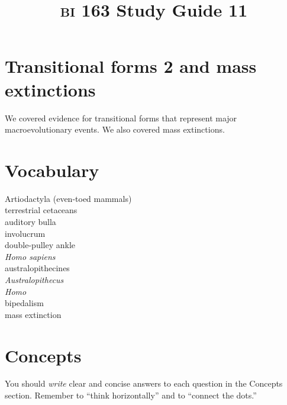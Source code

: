 \documentclass[letterpaper]{tufte-handout}
\title{{\scshape bi} 163 Study Guide 11}
\date{} %
\begin{document}
\maketitle	%

\section*{Transitional forms 2 and mass extinctions}

We covered evidence for transitional forms that represent major macroevolutionary events. We also covered mass extinctions.

\section*{Vocabulary}

\vspace{-1\baselineskip}
\begin{multicols}{2}
Artiodactyla (even-toed mammals) \\
terrestrial cetaceans \\
auditory bulla \\
involucrum \\
double-pulley ankle \\
\textit{Homo sapiens} \\
australopithecines \\
\textit{Australopithecus} \\
\textit{Homo} \\
bipedalism \\
mass extinction \\
\end{multicols}

\section*{Concepts}

You should \emph{write} clear and concise answers to each question in the Concepts section.  Remember to ``think horizontally'' and to ``connect the dots.'' \vspace*{\baselineskip}
\end{document}
